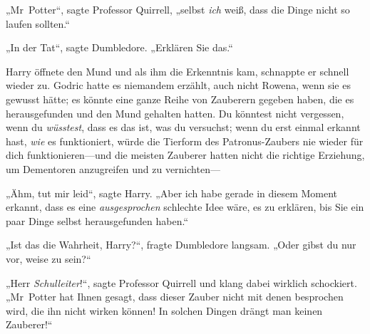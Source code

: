„Mr~Potter“, sagte Professor Quirrell, „selbst \emph{ich} weiß, dass die Dinge nicht so laufen sollten.“

„In der Tat“, sagte Dumbledore. „Erklären Sie das.“

Harry öffnete den Mund und als ihm die Erkenntnis kam, schnappte er schnell wieder zu. Godric hatte es niemandem erzählt, auch nicht Rowena, wenn sie es gewusst hätte; es könnte eine ganze Reihe von Zauberern gegeben haben, die es herausgefunden und den Mund gehalten hatten. Du könntest nicht vergessen, wenn du \emph{wüsstest}, dass es das ist, was du versuchst; wenn du erst einmal erkannt hast, \emph{wie} es funktioniert, würde die Tierform des Patronus-Zaubers nie wieder für dich funktionieren—und die meisten Zauberer hatten nicht die richtige Erziehung, um Dementoren anzugreifen und zu vernichten—

„Ähm, tut mir leid“, sagte Harry. „Aber ich habe gerade in diesem Moment erkannt, dass es eine \emph{ausgesprochen} schlechte Idee wäre, es zu erklären, bis Sie ein paar Dinge selbst herausgefunden haben.“

„Ist das die Wahrheit, Harry?“, fragte Dumbledore langsam. „Oder gibst du nur vor, weise zu sein?“

„Herr \emph{Schulleiter}!“, sagte Professor Quirrell und klang dabei wirklich schockiert. „Mr~Potter hat Ihnen gesagt, dass dieser Zauber nicht mit denen besprochen wird, die ihn nicht wirken können! In solchen Dingen drängt man keinen Zauberer!“

